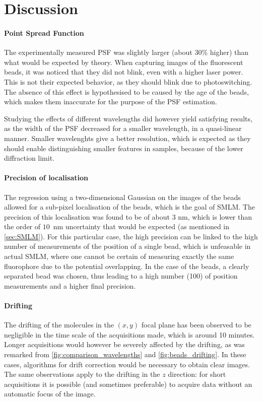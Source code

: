 \section{Discussion}
\paragraph{Point Spread Function}
The experimentally measured PSF was slightly larger (about $30$\% higher) than what would be expected by theory. When capturing images of the fluorescent beads, it was noticed that they did not blink, even with a higher laser power. This is not their expected behavior, as they should blink due to photoswitching. The absence of this effect is hypothesised to be caused by the age of the beads, which makes them inaccurate for the purpose of the PSF estimation.

Studying the effects of different wavelengths did however yield satisfying results, as the width of the PSF decreased for a smaller wavelength, in a quasi-linear manner. Smaller wavelenghts give a better resolution, which is expected as they should enable distinguishing smaller features in samples, because of the lower diffraction limit.

\paragraph{Precision of localisation}
The regression using a two-dimensional Gaussian on the images of the beads allowed for a sub-pixel localisation of the beads, which is the goal of SMLM. The precision of this localisation was found to be of about $3$ nm, which is lower than the order of \mbox{$10$ nm} uncertainty that would be expected (as mentioned in \autoref{sec:SMLM}). For this particular case, the high precision can be linked to the high number of measurements of the position of a single bead, which is unfeasable in actual SMLM, where one cannot be certain of measuring exactly the same fluorophore due to the potential overlapping. In the case of the beads, a clearly separated bead was chosen, thus leading to a high number (100) of position measurements and a higher final precision.

\paragraph{Drifting}
The drifting of the molecules in the $(x,y)$ focal plane has been observed to be negligible in the time scale of the acquisitions made, which is around 10 minutes.
Longer acquisitions would however be severely affected by the drifting, as was remarked from \autoref{fig:comparison_wavelengths} and \autoref{fig:beads_drifting}.
In these cases, algorithms for drift correction would be necessary to obtain clear images.
The same observations apply to the drifting in the $z$ direction: for short acquisitions it is possible (and sometimes preferable) to acquire data without an automatic focus of the image.


